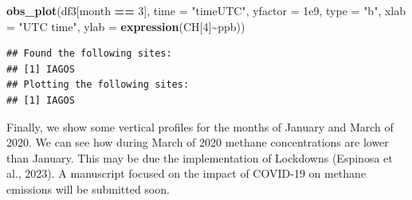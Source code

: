 \documentclass[10pt,a4paper,onecolumn]{article}
\newenvironment{Shaded}{\begin{snugshade}}{\end{snugshade}}
\newcommand{\AttributeTok}[1]{\textcolor[rgb]{0.13,0.29,0.53}{#1}}
\newcommand{\DecValTok}[1]{\textcolor[rgb]{0.00,0.00,0.81}{#1}}
\newcommand{\FloatTok}[1]{\textcolor[rgb]{0.00,0.00,0.81}{#1}}
\newcommand{\FunctionTok}[1]{\textcolor[rgb]{0.13,0.29,0.53}{\textbf{#1}}}
\newcommand{\NormalTok}[1]{#1}
\newcommand{\OtherTok}[1]{\textcolor[rgb]{0.56,0.35,0.01}{#1}}
\newcommand{\SpecialCharTok}[1]{\textcolor[rgb]{0.81,0.36,0.00}{\textbf{#1}}}
\newcommand{\StringTok}[1]{\textcolor[rgb]{0.31,0.60,0.02}{#1}}
\begin{document}
\begin{Shaded}
\begin{Highlighting}[]
\FunctionTok{obs\_plot}\NormalTok{(df3[month }\SpecialCharTok{==} \DecValTok{3}\NormalTok{], }\AttributeTok{time =} \StringTok{"timeUTC"}\NormalTok{, }\AttributeTok{yfactor =} \FloatTok{1e9}\NormalTok{, }\AttributeTok{type =} \StringTok{"b"}\NormalTok{,}
         \AttributeTok{xlab =} \StringTok{"UTC time"}\NormalTok{, }\AttributeTok{ylab =} \FunctionTok{expression}\NormalTok{(CH[}\DecValTok{4}\NormalTok{]}\SpecialCharTok{\textasciitilde{}}\NormalTok{ppb))}
\end{Highlighting}
\end{Shaded}

\begin{verbatim}
## Found the following sites: 
## [1] IAGOS
## Plotting the following sites: 
## [1] IAGOS
\end{verbatim}

Finally, we show some vertical profiles for the months of January and
March of 2020. We can see how during March of 2020 methane
concentrations are lower than January. This may be due the
implementation of Lockdowns (Espinosa et al., 2023). A manuscript
focused on the impact of COVID-19 on methane emissions will be submitted
soon.

\begin{Shaded}
\end{Shaded}
\end{document}
